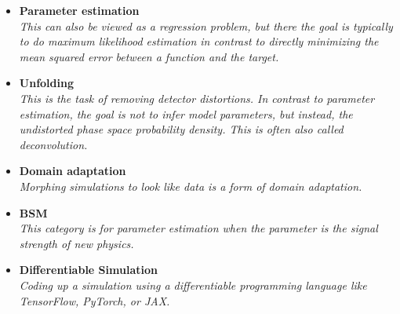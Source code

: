 \documentclass[12pt,letterpaper]{article}
\begin{document}
\begin{itemize}
	\begin{itemize}
		\item \textbf{Parameter estimation}~\cite{Andreassen:2019nnm,Stoye:2018ovl,Hollingsworth:2020kjg,Brehmer:2018kdj,Brehmer:2018eca,Brehmer:2019xox,Brehmer:2018hga,Cranmer:2015bka,Andreassen:2020gtw,Coogan:2020yux,Flesher:2020kuy,Bieringer:2020tnw,Nachman:2021yvi,Chatterjee:2021nms,NEURIPS2020_a878dbeb,Mishra-Sharma:2021oxe,Barman:2021yfh,Bahl:2021dnc,Arganda:2022qzy,Kong:2022rnd,Arganda:2022zbs,Butter:2022vkj,Neubauer:2022gbu,Rizvi:2023mws,Heinrich:2023bmt,Breitenmoser:2023tmi,Morandini:2023pwj,Barrue:2023ysk,Espejo:2023wzf}
		\\\textit{This can also be viewed as a regression problem, but there the goal is typically to do maximum likelihood estimation in contrast to directly minimizing the mean squared error between a function and the target.}
		\item \textbf{Unfolding}~\cite{Andreassen:2019cjw,Datta:2018mwd,Bellagente:2019uyp,Gagunashvili:2010zw,Glazov:2017vni,Martschei:2012pr,Lindemann:1995ut,Zech2003BinningFreeUB,1800956,Vandegar:2020yvw,Howard:2021pos,Baron:2021vvl,Andreassen:2021zzk,Komiske:2021vym,H1:2021wkz,Arratia:2021otl,Wong:2021zvv,Arratia:2022wny,Backes:2022vmn,Chan:2023tbf,Shmakov:2023kjj}
		\\\textit{This is the task of removing detector distortions.  In contrast to parameter estimation, the goal is not to infer model parameters, but instead, the undistorted phase space probability density.  This is often also called deconvolution.}
		\item \textbf{Domain adaptation}~\cite{Rogozhnikov:2016bdp,Andreassen:2019nnm,Cranmer:2015bka,2009.03796,Nachman:2021opi,Camaiani:2022kul,Schreck:2023pzs,Algren:2023qnb}
		\\\textit{Morphing simulations to look like data is a form of domain adaptation.}
		\item \textbf{BSM}~\cite{Andreassen:2020nkr,Hollingsworth:2020kjg,Brehmer:2018kdj,Brehmer:2018eca,Brehmer:2018hga,Brehmer:2019xox,Romao:2020ojy,deSouza:2022uhk,GomezAmbrosio:2022mpm,Castro:2022zpq,Anisha:2023xmh,Dennis:2023kfe}
		\\\textit{This category is for parameter estimation when the parameter is the signal strength of new physics.}
		\item \textbf{Differentiable Simulation}~\cite{Heinrich:2022xfa,Nachman:2022jbj,Lei:2022dvn,Napolitano:2023jhg,Shenoy:2023ros}
		\\\textit{Coding up a simulation using a differentiable programming language like TensorFlow, PyTorch, or JAX.}

\end{itemize}
\end{itemize}
\end{document}
